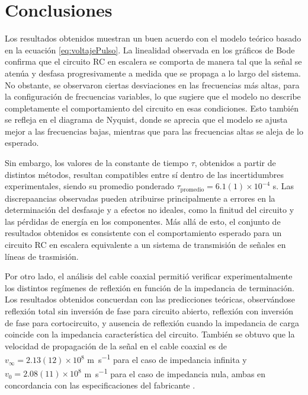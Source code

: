 \section{Conclusiones}

Los resultados obtenidos muestran un buen acuerdo con el modelo teórico basado en la ecuación \eqref{eq:voltajePulso}. La linealidad observada en los gráficos de Bode confirma que el circuito RC en escalera se comporta de manera tal que la señal se atenúa y desfasa progresivamente a medida que se propaga a lo largo del sistema. No obstante, se observaron ciertas desviaciones en las frecuencias más altas, para la configuración de frecuencias variables, lo que sugiere que el modelo no describe completamente el comportamiento del circuito en esas condiciones. Esto también se refleja en el diagrama de Nyquist, donde se aprecia que el modelo se ajusta mejor a las frecuencias bajas, mientras que para las frecuencias altas se aleja de lo esperado.  

Sin embargo, los valores de la constante de tiempo $\tau$, obtenidos a partir de distintos métodos, resultan compatibles entre sí dentro de las incertidumbres experimentales, siendo su promedio ponderado $\tau_{\text{promedio}} = 6.1(1)\times 10^{-4}$ \si{\second}. Las discrepaancias observadas pueden atribuirse principalmente a errores en la determinación del desfasaje y a efectos no ideales, como la finitud del circuito y las pérdidas de energía en los componentes. Más allá de esto, el conjunto de resultados obtenidos es consistente con el comportamiento esperado para un circuito RC en escalera equivalente a un sistema de transmisión de señales en líneas de trasmisión.

Por otro lado, el análisis del cable coaxial permitió verificar experimentalmente los distintos regímenes de reflexión en función de la impedancia de terminación. Los resultados obtenidos concuerdan con las predicciones teóricas, observándose reflexión total sin inversión de fase para circuito abierto, reflexión con inversión de fase para cortocircuito, y ausencia de reflexión cuando la impedancia de carga coincide con la impedancia característica del circuito. También se obtuvo que la velocidad de propagación de la señal en el cable coaxial es de \(v_{\infty} = 2.13(12) \times 10^8\) \si{\meter\per\second} para el caso de impedancia infinita y \(v_0 = 2.08(11) \times 10^8\) \si{\meter\per\second} para el caso de impedancia nula, ambas en concordancia con las especificaciones del fabricante \cite{RG58Cable}.


